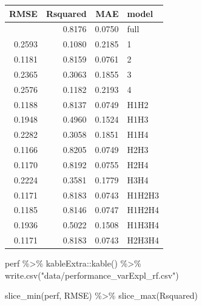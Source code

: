 \documentclass[
  letterpaper,
  DIV=11,
  numbers=noendperiod]{scrartcl}
\newenvironment{Shaded}{\begin{snugshade}}{\end{snugshade}}
\newcommand{\CommentTok}[1]{\textcolor[rgb]{0.37,0.37,0.37}{#1}}
\newcommand{\DecValTok}[1]{\textcolor[rgb]{0.68,0.00,0.00}{#1}}
\newcommand{\FunctionTok}[1]{\textcolor[rgb]{0.28,0.35,0.67}{#1}}
\newcommand{\NormalTok}[1]{\textcolor[rgb]{0.00,0.23,0.31}{#1}}
\newcommand{\OtherTok}[1]{\textcolor[rgb]{0.00,0.23,0.31}{#1}}
\newcommand{\SpecialCharTok}[1]{\textcolor[rgb]{0.37,0.37,0.37}{#1}}
\newcommand{\StringTok}[1]{\textcolor[rgb]{0.13,0.47,0.30}{#1}}
\begin{document}
\begin{Shaded}
\end{Shaded}

\begin{longtable}[]{@{}rrrl@{}}
\toprule\noalign{}
RMSE & Rsquared & MAE & model \\
\midrule\noalign{}
\endhead
\bottomrule\noalign{}
\endlastfoot
0.1174 & 0.8176 & 0.0750 & full \\
0.2593 & 0.1080 & 0.2185 & 1 \\
0.1181 & 0.8159 & 0.0761 & 2 \\
0.2365 & 0.3063 & 0.1855 & 3 \\
0.2576 & 0.1182 & 0.2193 & 4 \\
0.1188 & 0.8137 & 0.0749 & H1H2 \\
0.1948 & 0.4960 & 0.1524 & H1H3 \\
0.2282 & 0.3058 & 0.1851 & H1H4 \\
0.1166 & 0.8205 & 0.0749 & H2H3 \\
0.1170 & 0.8192 & 0.0755 & H2H4 \\
0.2224 & 0.3581 & 0.1779 & H3H4 \\
0.1171 & 0.8183 & 0.0743 & H1H2H3 \\
0.1185 & 0.8146 & 0.0747 & H1H2H4 \\
0.1936 & 0.5022 & 0.1508 & H1H3H4 \\
0.1171 & 0.8183 & 0.0743 & H2H3H4 \\
\end{longtable}

\begin{Shaded}
\begin{Highlighting}[]
\NormalTok{perf }\SpecialCharTok{\%\textgreater{}\%} 
\NormalTok{    kableExtra}\SpecialCharTok{::}\FunctionTok{kable}\NormalTok{() }\SpecialCharTok{\%\textgreater{}\%} 
    \FunctionTok{write.csv}\NormalTok{(}\StringTok{"data/performance\_varExpl\_rf.csv"}\NormalTok{)}

\FunctionTok{slice\_min}\NormalTok{(perf, RMSE) }\SpecialCharTok{\%\textgreater{}\%} 
    \FunctionTok{slice\_max}\NormalTok{(Rsquared)}
\end{Highlighting}
\end{Shaded}
\end{document}
